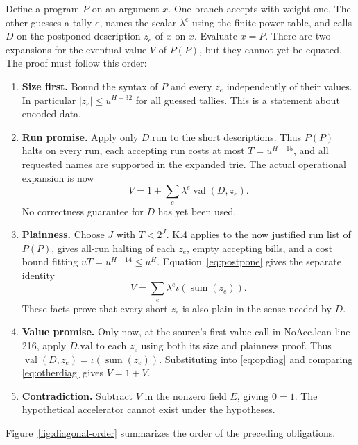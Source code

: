 \documentclass[11pt,letterpaper]{article}
\theoremstyle{definition}\newtheorem{definition}[theorem]{Definition}\newtheorem{example}[theorem]{Example}
\theoremstyle{remark}\newtheorem{remark}[theorem]{Remark}
\begin{document}
Define a program $P$ on an argument $x$. One branch accepts with weight one. The other guesses a tally $e$, names the scalar $\lambda^e$ using the finite power table, and calls $D$ on the postponed description $z_e$ of $x$ on $x$. Evaluate $x=P$. There are two expansions for the eventual value $V$ of $P(P)$, but they cannot yet be equated. The proof must follow this order:
\begin{enumerate}[leftmargin=1.7em]
\item \textbf{Size first.} Bound the syntax of $P$ and every $z_e$ independently of their values. In particular $|z_e|\le u^{H-32}$ for all guessed tallies. This is a statement about encoded data.
\item \textbf{Run promise.} Apply only $D.\mathrm{run}$ to the short descriptions. Thus $P(P)$ halts on every run, each accepting run costs at most $T=u^{H-15}$, and all requested names are supported in the expanded trie. The actual operational expansion is now
\begin{equation}\label{eq:opdiag}
 V=1+\sum_e\lambda^e\operatorname{val}(D,z_e).
\end{equation}
No correctness guarantee for $D$ has yet been used.
\item \textbf{Plainness.} Choose $J$ with $T<2^J$. K.4 applies to the now justified run list of $P(P)$, gives all-run halting of each $z_e$, empty accepting bills, and a cost bound fitting $uT=u^{H-14}\le u^H$. Equation~\eqref{eq:postpone} gives the separate identity
\begin{equation}\label{eq:otherdiag}
 V=\sum_e\lambda^e\iota(\operatorname{sum}(z_e)).
\end{equation}
These facts prove that every short $z_e$ is also plain in the sense needed by $D$.
\item \textbf{Value promise.} Only now, at the source's first value call in NoAcc.lean line 216, apply $D.\mathrm{val}$ to each $z_e$ using both its size and plainness proof. Thus $\operatorname{val}(D,z_e)=\iota(\operatorname{sum}(z_e))$. Substituting into \eqref{eq:opdiag} and comparing \eqref{eq:otherdiag} gives $V=1+V$.
\item \textbf{Contradiction.} Subtract $V$ in the nonzero field $E$, giving $0=1$. The hypothetical accelerator cannot exist under the hypotheses.
\end{enumerate}
Figure~\ref{fig:diagonal-order} summarizes the order of the preceding obligations.
\end{document}
